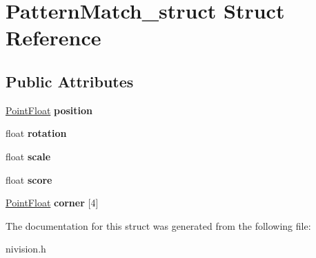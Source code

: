 \hypertarget{structPatternMatch__struct}{
\section{PatternMatch\_\-struct Struct Reference}
\label{structPatternMatch__struct}
}
\subsection*{Public Attributes}
\begin{DoxyCompactItemize}
\item 
\hypertarget{structPatternMatch__struct_a9fbe7656bb01b36f00295ffe9d988145}{
\hyperlink{structPointFloat__struct}{PointFloat} {\bfseries position}}
\label{structPatternMatch__struct_a9fbe7656bb01b36f00295ffe9d988145}

\item 
\hypertarget{structPatternMatch__struct_ad7d12f3601435e63ef151948dcc011fd}{
float {\bfseries rotation}}
\label{structPatternMatch__struct_ad7d12f3601435e63ef151948dcc011fd}

\item 
\hypertarget{structPatternMatch__struct_a54e8bf6c11d61f48b7b1e7a58c05cff8}{
float {\bfseries scale}}
\label{structPatternMatch__struct_a54e8bf6c11d61f48b7b1e7a58c05cff8}

\item 
\hypertarget{structPatternMatch__struct_a479e92bce65539f70d0aabfade021d0c}{
float {\bfseries score}}
\label{structPatternMatch__struct_a479e92bce65539f70d0aabfade021d0c}

\item 
\hypertarget{structPatternMatch__struct_a9068b5f0c377380130d7c83a1f5c3fbc}{
\hyperlink{structPointFloat__struct}{PointFloat} {\bfseries corner} \mbox{[}4\mbox{]}}
\label{structPatternMatch__struct_a9068b5f0c377380130d7c83a1f5c3fbc}

\end{DoxyCompactItemize}


The documentation for this struct was generated from the following file:\begin{DoxyCompactItemize}
\item 
nivision.h\end{DoxyCompactItemize}
